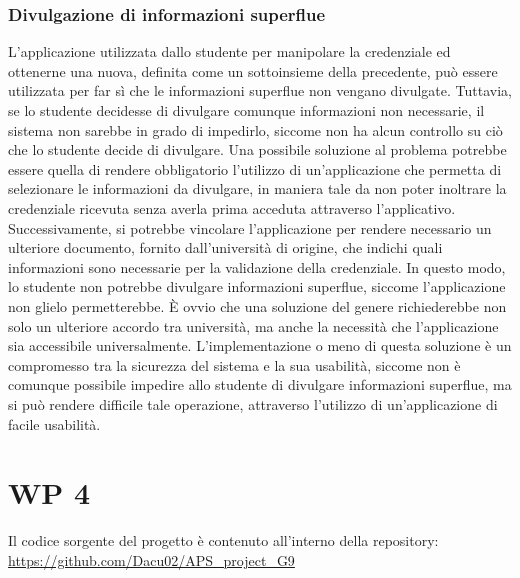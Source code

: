 \documentclass[a4paper,12pt]{article}
\begin{document}
\subsubsection{Divulgazione di informazioni superflue}
L'applicazione utilizzata dallo studente per manipolare la credenziale ed ottenerne una nuova, definita come un sottoinsieme della precedente, può essere utilizzata per far sì che le informazioni superflue non vengano divulgate. Tuttavia, se lo studente decidesse di divulgare comunque informazioni non necessarie, il sistema non sarebbe in grado di impedirlo, siccome non ha alcun controllo su ciò che lo studente decide di divulgare.
\newline Una possibile soluzione al problema potrebbe essere quella di rendere obbligatorio l'utilizzo di un'applicazione che permetta di selezionare le informazioni da divulgare, in maniera tale da non poter inoltrare la credenziale ricevuta senza averla prima acceduta attraverso l'applicativo. Successivamente, si potrebbe vincolare l'applicazione per rendere necessario un ulteriore documento, fornito dall'università di origine, che indichi quali informazioni sono necessarie per la validazione della credenziale. In questo modo, lo studente non potrebbe divulgare informazioni superflue, siccome l'applicazione non glielo permetterebbe.
\newline È ovvio che una soluzione del genere richiederebbe non solo un ulteriore accordo tra università, ma anche la necessità che l'applicazione sia accessibile universalmente. L'implementazione o meno di questa soluzione è un compromesso tra la sicurezza del sistema e la sua usabilità, siccome non è comunque possibile impedire allo studente di divulgare informazioni superflue, ma si può rendere difficile tale operazione, attraverso l'utilizzo di un'applicazione di facile usabilità.
\newpage
\section{WP 4}
Il codice sorgente del progetto è contenuto all'interno della repository: \newline\url{https://github.com/Dacu02/APS_project_G9}
\end{document}
